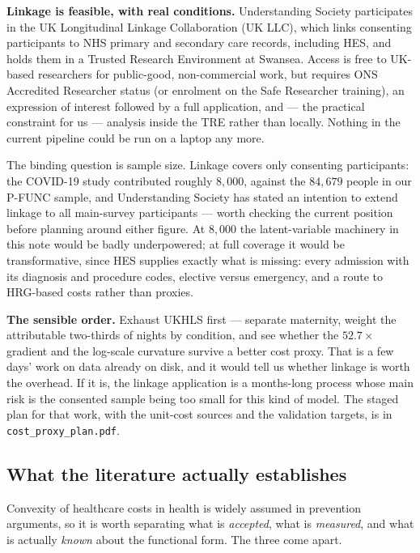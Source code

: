 \documentclass[11pt]{article}
\newcommand{\code}[1]{\texttt{\small #1}}
\begin{document}
\textbf{Linkage is feasible, with real conditions.} Understanding Society
participates in the UK Longitudinal Linkage Collaboration (UK LLC), which
links consenting participants to NHS primary and secondary care records,
including HES, and holds them in a Trusted Research Environment at Swansea.
Access is free to UK-based researchers for public-good, non-commercial work,
but requires ONS Accredited Researcher status (or enrolment on the Safe
Researcher training), an expression of interest followed by a full
application, and --- the practical constraint for us --- analysis inside the
TRE rather than locally. Nothing in the current pipeline could be run on a
laptop any more.

The binding question is sample size. Linkage covers only consenting
participants: the COVID-19 study contributed roughly $8{,}000$, against the
$84{,}679$ people in our P-FUNC sample, and Understanding Society has stated
an intention to extend linkage to all main-survey participants --- worth
checking the current position before planning around either figure. At
$8{,}000$ the latent-variable machinery in this note would be badly
underpowered; at full coverage it would be transformative, since HES supplies
exactly what is missing: every admission with its diagnosis and procedure
codes, elective versus emergency, and a route to HRG-based costs rather than
proxies.

\textbf{The sensible order.} Exhaust UKHLS first --- separate maternity,
weight the attributable two-thirds of nights by condition, and see whether
the $52.7\times$ gradient and the log-scale curvature survive a better cost
proxy. That is a few days' work on data already on disk, and it would tell us
whether linkage is worth the overhead. If it is, the linkage application is a
months-long process whose main risk is the consented sample being too small
for this kind of model. The staged plan for that work, with the unit-cost
sources and the validation targets, is in \code{cost\_proxy\_plan.pdf}.

\subsection{What the literature actually establishes}
\label{sec:convexlit}

Convexity of healthcare costs in health is widely assumed in prevention
arguments, so it is worth separating what is \emph{accepted}, what is
\emph{measured}, and what is actually \emph{known} about the functional form.
The three come apart.
\end{document}
